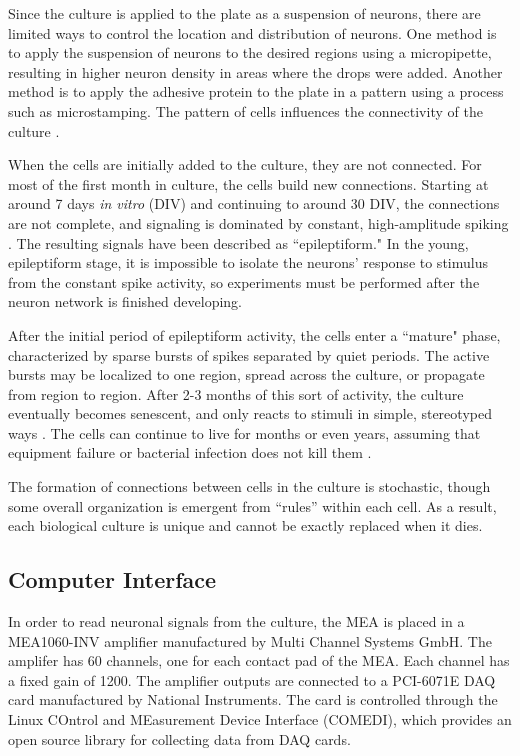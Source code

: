 \documentclass[letterpaper]{article}
\begin{document}
Since the culture is applied to the plate as a suspension of neurons, there are limited ways to control the location and distribution of neurons. 
One method is to apply the suspension of neurons to the desired regions using a micropipette, resulting in higher neuron density in areas where the drops were added. 
Another method is to apply the adhesive protein to the plate in a pattern using a process such as microstamping. 
The pattern of cells influences the connectivity of the culture \cite{sorkin2006compact}.

When the cells are initially added to the culture, they are not connected. 
For most of the first month in culture, the cells build new connections. 
Starting at around 7 days \emph{in vitro} (DIV) and continuing to around 30 DIV, the connections are not complete, and signaling is dominated by constant, high-amplitude spiking \cite{warwick2010controlling}. 
The resulting signals have been described as ``epileptiform."
In the young, epileptiform stage, it is impossible to isolate the neurons' response to stimulus from the constant spike activity, so experiments must be performed after the neuron network is finished developing. 

After the initial period of epileptiform activity, the cells enter a ``mature" phase, characterized by sparse bursts of spikes separated by quiet periods. 
The active bursts may be localized to one region, spread across the culture, or propagate from region to region. 
After 2-3 months of this sort of activity, the culture eventually becomes senescent, and only reacts to stimuli in simple, stereotyped ways \cite{warwick2010controlling}. 
The cells can continue to live for months or even years, assuming that equipment failure or bacterial infection does not kill them \cite{potter2001new}. 

The formation of connections between cells in the culture is stochastic, though some overall organization is emergent from ``rules'' within each cell. 
As a result, each biological culture is unique and cannot be exactly replaced when it dies. 

\subsection{Computer Interface}

In order to read neuronal signals from the culture, the MEA is placed in a MEA1060-INV amplifier manufactured by Multi Channel Systems GmbH. 
The amplifer has 60 channels, one for each contact pad of the MEA.
Each channel has a fixed gain of 1200.
The amplifier outputs are connected to a PCI-6071E DAQ card manufactured by National Instruments. 
The card is controlled through the Linux COntrol and MEasurement Device Interface (COMEDI), which provides an open source library for collecting data from DAQ cards. 
\end{document}
